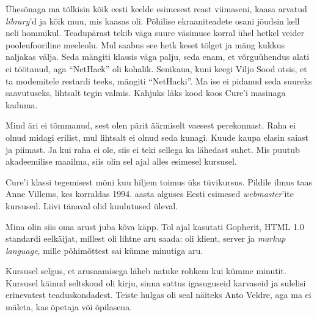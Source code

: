 
Ühesõnaga ma tõlkisin kõik eesti keelde esimesest reast viimaseni, kaasa arvatud \emph{library}'d ja kõik muu, mis kaasas oli. Põhilise ekraani{\-}teadete osani jõudsin 
kell neli hommikul. Teadupärast tekib väga suure väsimuse korral ühel hetkel veider pooleufooriline meeleolu. Mul saabus see hetk keset tõlget ja mäng kukkus
naljakas välja. Seda mängiti klassis väga palju, seda enam, et 
võrguühendus alati ei töötanud, aga \enquote{NetHack} oli kohalik. Senikaua, 
kuni keegi Viljo Sood otsis, et ta 
modemitele restardi teeks, mängiti \enquote{NetHacki}. Ma ise ei pidanud seda suureks saavutuseks, lihtsalt tegin valmis. Kahjuks läks kood koos Cure'i 
masinaga kaduma.


Mind äri ei tõmmanud, sest olen pärit äärmiselt vaesest perekonnast. Raha ei 
olnud midagi erilist, mul lihtsalt ei olnud seda kunagi. Kuude kaupa elasin saiast ja piimast. Ja kui raha ei ole, siis ei teki sellega ka lähedast 
suhet. Mis puutub akadeemilise maailma, siis olin sel ajal
alles esimesel kursusel.

Cure'i klassi tegemisest mõni kuu hiljem toimus üks tüvikursus. Pildile ilmus taas Anne Villems, kes korraldas 1994. aasta alguses Eesti esimesed \emph{webmaster}'ite kursused. 
Liivi tänaval olid kuulutused üleval.

Mina olin siis oma arust juba kõva käpp. 
Tol ajal kasutati Gopherit, HTML 1.0 standardi eelkäijat, millest oli lihtne aru saada: oli klient, server ja \emph{markup language}, mille 
põhimõttest sai kümne minutiga aru.

Kursusel selgus, et arusaamisega läheb natuke 
rohkem kui kümme minutit. Kursusel käinud seltskond oli 
kirju, sinna sattus igasuguseid karvaseid ja sulelisi erinevatest 
teaduskondadest. Teiste hulgas oli seal näiteks Anto Veldre, aga 
ma ei mäleta, kas õpetaja või õpilasena.

